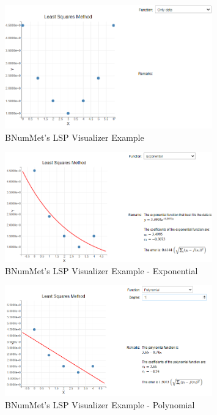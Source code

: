 \begin{figure}[H]
    \centering
    \includegraphics[width=0.8\textwidth]{Include/Images/Thesis/Development/Visualizers/LSP/BNumMet.LSP.Ex1.png}
    \caption{BNumMet's LSP Visualizer Example }
    \label{fig:BNumMet's Least Squares Visualizer Example}
\end{figure}
\begin{figure}[H]
    \centering
    \includegraphics[width=0.8\textwidth]{Include/Images/Thesis/Development/Visualizers/LSP/BNumMet.LSP.Ex1.1.png}
    \caption{BNumMet's LSP Visualizer Example - Exponential}
    \label{fig:BNumMet's Least Squares Visualizer Example- Exponential}
\end{figure}
\begin{figure}[H]
    \centering
    \includegraphics[width=0.8\textwidth]{Include/Images/Thesis/Development/Visualizers/LSP/BNumMet.LSP.Ex1.2.png}
    \caption{BNumMet's LSP Visualizer Example - Polynomial}
    \label{fig:BNumMet's Least Squares Visualizer Example- Polynomial}
\end{figure}
